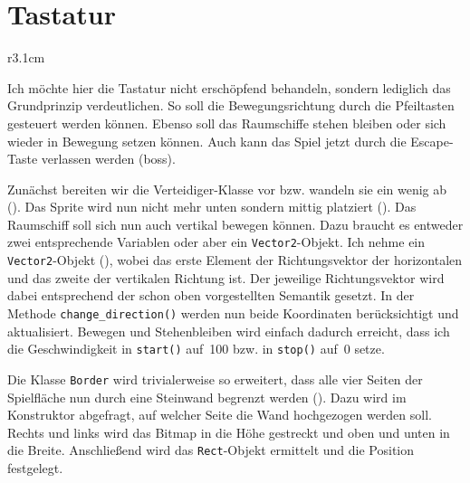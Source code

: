 \newpage
\section{Tastatur}

\begin{wrapfigure}[10]{r}{3.1cm}%
	\begin{center}%
		\vspace{-1cm}%
	\end{center}%
\end{wrapfigure}%
Ich möchte hier die Tastatur nicht erschöpfend behandeln, sondern lediglich das Grundprinzip verdeutlichen. So soll die Bewegungsrichtung durch die Pfeiltasten gesteuert werden können. Ebenso soll das Raumschiffe stehen bleiben oder sich wieder in Bewegung setzen können. Auch kann das Spiel jetzt durch die Escape-Taste verlassen werden (\Gls{boss}).

Zunächst bereiten wir die Verteidiger-Klasse vor bzw. wandeln sie ein wenig ab (). Das Sprite wird nun nicht mehr unten sondern mittig platziert (). Das Raumschiff soll sich nun auch vertikal bewegen können. Dazu braucht es entweder zwei entsprechende Variablen oder aber ein \texttt{Vector2}-Objekt. Ich nehme ein \texttt{Vector2}-Objekt (), wobei das erste Element der Richtungsvektor der horizontalen und das zweite der vertikalen Richtung ist. Der jeweilige Richtungsvektor wird dabei entsprechend der schon oben vorgestellten Semantik gesetzt. In der Methode \texttt{change\_direction()} werden nun beide Koordinaten berücksichtigt und aktualisiert. Bewegen und Stehenbleiben wird einfach dadurch erreicht, dass ich die Geschwindigkeit in \texttt{start()} auf~100 bzw. in \texttt{stop()} auf~0 setze.


Die Klasse \texttt{Border} wird trivialerweise so erweitert, dass alle vier Seiten der Spielfläche nun durch eine Steinwand begrenzt werden (). Dazu wird im Konstruktor abgefragt, auf welcher Seite die Wand hochgezogen werden soll. Rechts und links wird das Bitmap in die Höhe gestreckt und oben und unten in die Breite. Anschließend wird das \texttt{Rect}-Objekt ermittelt und die Position festgelegt.

